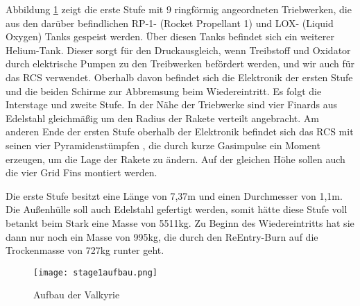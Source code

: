 Abbildung \ref{abb_1stage} zeigt die erste Stufe mit $9$ ringförmig angeordneten Triebwerken, die aus den darüber befindlichen RP-1- (Rocket Propellant 1) und LOX- (Liquid Oxygen) Tanks gespeist werden. Über diesen Tanks befindet sich ein weiterer Helium-Tank. Dieser sorgt für den Druckausgleich, wenn Treibstoff und Oxidator durch elektrische Pumpen zu den Treibwerken befördert werden, und wir auch für das RCS verwendet. Oberhalb davon befindet sich die Elektronik der ersten Stufe und die beiden Schirme zur Abbremsung beim Wiedereintritt. Es folgt die Interstage und zweite Stufe.
In der Nähe der Triebwerke sind vier Finards aus Edelstahl gleichmäßig um den Radius der Rakete verteilt angebracht. Am anderen Ende der ersten Stufe oberhalb der Elektronik befindet sich das RCS mit seinen vier Pyramidenstümpfen \cite{flugbahnBarz}, die durch kurze Gasimpulse ein Moment erzeugen, um die Lage der Rakete zu ändern. Auf der gleichen Höhe sollen auch die vier Grid Fins montiert werden.

Die erste Stufe besitzt eine Länge von 7,37m und einen Durchmesser von 1,1m. Die Außenhülle soll auch Edelstahl gefertigt werden, somit hätte diese Stufe voll betankt beim Stark eine Masse von 5511kg. Zu Beginn des Wiedereintritts hat sie dann nur noch ein Masse von 995kg, die durch den ReEntry-Burn auf die Trockenmasse von 727kg runter geht.
\begin{figure}[h]
	\centering
	\texttt{[image: stage1aufbau.png]}
	\begin{flushright}
	\end{flushright}
	\caption{Aufbau der Valkyrie}
	\label{abb_1stage}
\end{figure}

